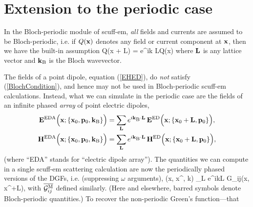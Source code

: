\documentclass[letterpaper]{article}
\begin{document}
\section{Extension to the periodic case}

In the Bloch-periodic module of {\sc scuff-em}, \textit{all}
fields and currents are assumed to be Bloch-periodic, i.e.
if $Q(\mathbf{x})$ denotes any field or current component at $\mathbf{x}$,
then we have the built-in assumption
{Q(\vb x + \vb L) = e^{i\vb k \cdot \vb L}Q(\vb x)}
where $\mathbf{L}$ is any lattice vector and 
$\mathbf{k}_{\text{\scriptsize B}}$ is the Bloch wavevector.

The fields of a point dipole, equation (\ref{EHED}), do \textit{not}
satisfy (\ref{BlochCondition}), and hence may not be used in
Bloch-periodic {\sc scuff-em} calculations. Instead, what we can 
simulate in the periodic case are the fields of an infinite
phased \textit{array} of point electric dipoles,
\begin{subequations}
\begin{align}
 \mathbf{E}^{\text{\scriptsize EDA}}\Big(\mathbf{x}; \{ \mathbf{x}_0, \mathbf{p}_0, \mathbf{k}_{\text{\scriptsize B}}\}\Big)
&=\sum_{\mathbf{L}} e^{i\mathbf{k}_{\text{\scriptsize B}}\cdot \mathbf{L}}
  \, \mathbf{E}^{\text{\scriptsize ED}}\Big(\mathbf{x}; \{\mathbf{x}_{\text{\scriptsize 0}}+\mathbf{L}, \mathbf{p}_0\} \Big),
\\
 \mathbf{H}^{\text{\scriptsize EDA}}\Big(\mathbf{x}; \{ \mathbf{x}_0, \mathbf{p}_0, \mathbf{k}_{\text{\scriptsize B}}\}\Big)
&=\sum_{\mathbf{L}} e^{i\mathbf{k}_{\text{\scriptsize B}}\cdot \mathbf{L}}
  \, \mathbf{H}^{\text{\scriptsize ED}}\Big(\mathbf{x}; \{\mathbf{x}_{\text{\scriptsize 0}}+\mathbf{L}, \mathbf{p}_0\} \Big),
\end{align}
\label{EHEDA}
\end{subequations}
(where ``EDA'' stands for ``electric dipole array''). The quantities
we can compute in a single {\sc scuff-em} scattering calculation
are now the periodically phased versions of the DGFs, i.e.
(suppressing $\omega$ arguments),
{
 (\vb x, \vb x^\prime, \vb k)
 \equiv \sum_{\vb L} e^{i\vb k\cdot \vb L}
  \mc G_{ij}(\vb x, \vb x^\prime+\vb L), 
}
with $\overline{\mathcal{G}_{ij}^{\text{\scriptsize M}}}$ defined similarly.
(Here and elsewhere, barred symbols denote Bloch-periodic 
quantities.) To recover the non-periodic Green's function---that
\end{document}
